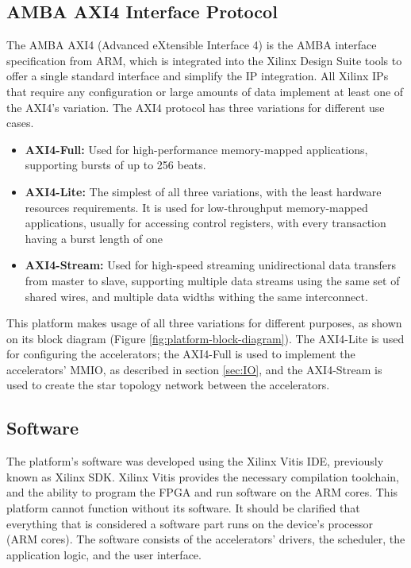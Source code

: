 \subsection{AMBA AXI4 Interface Protocol}
\label{sec:AMBA-AXI4-Interface-Protocol}
The AMBA AXI4 (Advanced eXtensible Interface 4) \cite{UG1037-Vivado-Design-Suite-AXI-Reference-Guide} is the AMBA interface specification from ARM, which is integrated into the Xilinx Design Suite tools to offer a single standard interface and simplify the IP integration. All Xilinx IPs that require any configuration or large amounts of data implement at least one of the AXI4's variation. The AXI4 protocol has three variations for different use cases.
\begin{itemize}
	\item \textbf{AXI4-Full:} Used for high-performance memory-mapped applications, supporting bursts of up to 256 beats.
	\item \textbf{AXI4-Lite:} The simplest of all three variations, with the least hardware resources requirements. It is used for low-throughput memory-mapped applications, usually for accessing control registers, with every transaction having a burst length of one
	\item \textbf{AXI4-Stream:} Used for high-speed streaming unidirectional data transfers from master to slave, supporting multiple data streams using the same set of shared wires, and multiple data widths withing the same interconnect.
\end{itemize}

This platform makes usage of all three variations for different purposes, as shown on its block diagram (Figure \ref{fig:platform-block-diagram}). The AXI4-Lite is used for configuring the accelerators; the AXI4-Full is used to implement the accelerators' MMIO, as described in section \ref{sec:IO}, and the AXI4-Stream is used to create the star topology network between the accelerators.

\subsection{Software}
The platform's software was developed using the Xilinx Vitis IDE, previously known as Xilinx SDK. Xilinx Vitis provides the necessary compilation toolchain, and the ability to program the FPGA and run software on the ARM cores. This platform cannot function without its software. It should be clarified that everything that is considered a software part runs on the device's processor (ARM cores). The software consists of the accelerators' drivers, the scheduler, the application logic, and the user interface.

